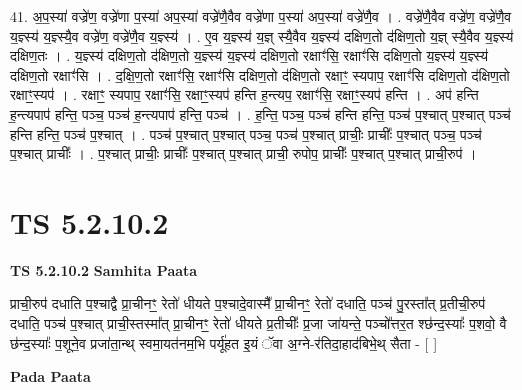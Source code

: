 \documentclass[17pt]{extarticle}
\begin{document}
41. अ॒प॒स्या॑ वज्रे॑ण॒ वज्रे॑णा प॒स्या॑ अप॒स्या॑ वज्रे॑णै॒वैव वज्रे॑णा प॒स्या॑ अप॒स्या॑ वज्रे॑णै॒व । . वज्रे॑णै॒वैव वज्रे॑ण॒ वज्रे॑णै॒व य॒ज्ञ्स्य॑ य॒ज्ञ्स्यै॒व वज्रे॑ण॒ वज्रे॑णै॒व य॒ज्ञ्स्य॑ । . ए॒व य॒ज्ञ्स्य॑ य॒ज्ञ् स्यै॒वैव य॒ज्ञ्स्य॑ दक्षिण॒तो द॑क्षिण॒तो य॒ज्ञ् स्यै॒वैव य॒ज्ञ्स्य॑ दक्षिण॒तः । . य॒ज्ञ्स्य॑ दक्षिण॒तो द॑क्षिण॒तो य॒ज्ञ्स्य॑ य॒ज्ञ्स्य॑ दक्षिण॒तो रक्षाꣳ॑सि॒ रक्षाꣳ॑सि दक्षिण॒तो य॒ज्ञ्स्य॑ य॒ज्ञ्स्य॑ दक्षिण॒तो रक्षाꣳ॑सि । . द॒क्षि॒ण॒तो रक्षाꣳ॑सि॒ रक्षाꣳ॑सि दक्षिण॒तो द॑क्षिण॒तो रक्षाꣳ॒॒ स्यपाप॒ रक्षाꣳ॑सि दक्षिण॒तो द॑क्षिण॒तो रक्षाꣳ॒॒स्यप॑ । . रक्षाꣳ॒॒ स्यपाप॒ रक्षाꣳ॑सि॒ रक्षाꣳ॒॒स्यप॑ हन्ति ह॒न्त्यप॒ रक्षाꣳ॑सि॒ रक्षाꣳ॒॒स्यप॑ हन्ति । . अप॑ हन्ति ह॒न्त्यपाप॑ हन्ति॒ पञ्च॒ पञ्च॑ ह॒न्त्यपाप॑ हन्ति॒ पञ्च॑ । . ह॒न्ति॒ पञ्च॒ पञ्च॑ हन्ति हन्ति॒ पञ्च॑ प॒श्चात् प॒श्चात् पञ्च॑ हन्ति हन्ति॒ पञ्च॑ प॒श्चात् । . पञ्च॑ प॒श्चात् प॒श्चात् पञ्च॒ पञ्च॑ प॒श्चात् प्राचीः॒ प्राचीः᳚ प॒श्चात् पञ्च॒ पञ्च॑ प॒श्चात् प्राचीः᳚ । . प॒श्चात् प्राचीः॒ प्राचीः᳚ प॒श्चात् प॒श्चात् प्राची॒ रुपोप॒ प्राचीः᳚ प॒श्चात् प॒श्चात् प्राची॒रुप॑ । \newline
\pagebreak
{}

\section{ TS 5.2.10.2 }

\textbf{TS 5.2.10.2 } \newline
\textbf{Samhita Paata} \newline

प्राची॒रुप॑ दधाति प॒श्चाद्वै प्रा॒चीनꣳ॒॒ रेतो॑ धीयते प॒श्चादे॒वास्मै᳚ प्रा॒चीनꣳ॒॒ रेतो॑ दधाति॒ पञ्च॑ पु॒रस्ता᳚त् प्र॒तीची॒रुप॑ दधाति॒ पञ्च॑ प॒श्चात् प्राची॒स्तस्मा᳚त् प्रा॒चीनꣳ॒॒ रेतो॑ धीयते प्र॒तीचीः᳚ प्र॒जा जा॑यन्ते॒ पञ्चो᳚त्तर॒त श्छ॑न्द॒स्याः᳚ प॒शवो॒ वै छ॑न्द॒स्याः᳚ प॒शूने॒व प्रजा॑ता॒न्थ् स्वमा॒यत॑नम॒भि पर्यू॑हत इ॒यं ॅवा अ॒ग्ने-र॑तिदा॒हाद॑बिभे॒थ् सैता - [  ] \newline

\textbf{Pada Paata} \newline
\end{document}
